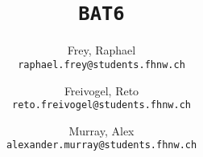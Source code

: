 \author{%
    Frey, Raphael\\
    \texttt{raphael.frey@students.fhnw.ch}
    \and
    Freivogel, Reto\\
    \texttt{reto.freivogel@students.fhnw.ch}
    \and
    Murray, Alex\\
    \texttt{alexander.murray@students.fhnw.ch}
}

\title{%
    \textbf{\Huge{\texttt{BAT6}}} \\
}

